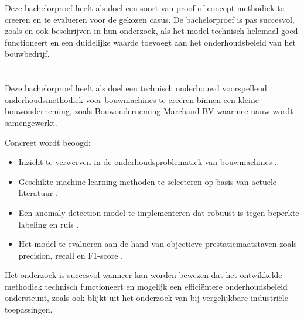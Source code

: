 Deze bachelorproef heeft als doel een soort van proof-of-concept methodiek te creëren en te evalueren voor de gekozen casus. De bachelorproef is pas succesvol, zoals \textcite{Raffaele2024} en \textcite{Mahale2025} ook beschrijven in hun onderzoek, als het model technisch helemaal goed functioneert en een duidelijke waarde toevoegt aan het onderhoudsbeleid van het bouwbedrijf.

\section{}%
\label{sec:onderzoeksdoelstelling}


Deze bachelorproef heeft als doel een technisch onderbouwd voorspellend onderhoudsmethodiek voor bouwmachines te creëren binnen een kleine bouwonderneming, zoals Bouwonderneming Marchand BV waarmee nauw wordt samengewerkt.

Concreet wordt beoogd:
\begin{itemize}
    \item Inzicht te verwerven in de onderhoudsproblematiek van bouwmachines \autocite{Mikulic2024}.
    \item Geschikte machine learning-methoden te selecteren op basis van actuele literatuur  \autocite{Carvalho2019, Elahi2023}.
    \item Een anomaly detection-model te implementeren dat robuust is tegen beperkte labeling en ruis \autocite{Aggarwal2025, Wang2025}.
    \item Het model te evalueren aan de hand van objectieve prestatiemaatstaven zoals precision, recall en F1-score \autocite{Roehrich2024, Mahale2025}.
\end{itemize}

Het onderzoek is succesvol wanneer kan worden bewezen dat het ontwikkelde methodiek technisch functioneert en mogelijk een efficiëntere onderhoudsbeleid ondersteunt, zoals ook blijkt uit het onderzoek van \textcite{ErRatby2025} bij vergelijkbare industriële toepassingen.


